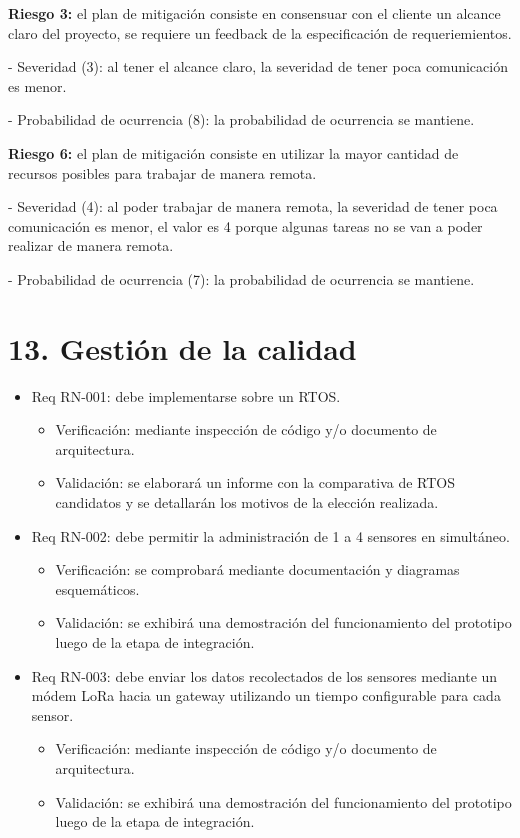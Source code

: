 \documentclass[11pt]{charter}
\begin{document}
 
\textbf{Riesgo 3: } el plan de mitigación consiste en consensuar con el cliente un alcance claro del proyecto, se requiere un feedback de la especificación de requeriemientos.
  
  - Severidad (3): al tener el alcance claro, la severidad de tener poca comunicación es menor.
  
  - Probabilidad de ocurrencia (8): la probabilidad de ocurrencia se mantiene.

\textbf{Riesgo 6: } el plan de mitigación consiste en utilizar la mayor cantidad de recursos posibles para trabajar de manera remota.
  
  - Severidad (4): al poder trabajar de manera remota, la severidad de tener poca comunicación es menor, el valor es 4 porque algunas tareas no se van a poder realizar de manera remota.
  
  - Probabilidad de ocurrencia (7): la probabilidad de ocurrencia se mantiene.

\section{13. Gestión de la calidad}
\label{sec:calidad}

\begin{itemize} 
\item Req RN-001: debe implementarse sobre un RTOS.
\begin{itemize}
\item Verificación: mediante inspección de código y/o documento de arquitectura. 
\item Validación: se elaborará un informe con la comparativa de RTOS candidatos y se detallarán los motivos de la elección realizada.  
\end{itemize}
\end{itemize}

\begin{itemize} 
\item Req RN-002: debe permitir la administración de 1 a 4 sensores en simultáneo.
\begin{itemize}
\item Verificación: se comprobará mediante documentación y diagramas esquemáticos. 
\item Validación: se exhibirá una demostración del funcionamiento del prototipo luego de la etapa de integración.  
\end{itemize}
\end{itemize}

\begin{itemize} 
\item Req RN-003: debe enviar los datos recolectados de los sensores mediante un módem LoRa hacia un gateway utilizando un tiempo configurable para cada sensor.
\begin{itemize}
\item Verificación: mediante inspección de código y/o documento de arquitectura. 
\item Validación: se exhibirá una demostración del funcionamiento del prototipo luego de la etapa de integración.  
\end{itemize}
\end{itemize}
\end{document}
